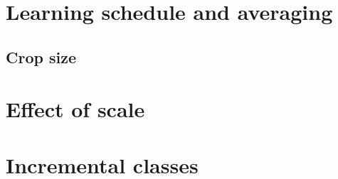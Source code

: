 \section {Learning schedule and averaging}
\label{sec:schedule}








\subsection {Crop size}
\label{sec:crop_size}



\section {Effect of scale}
\label{sec:detection_architecture}



\section {Incremental classes}
\label{sec:incremental}


